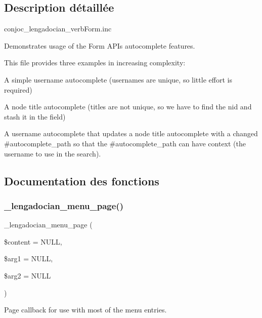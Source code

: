 \subsection{Description détaillée}
conjoc\+\_\+lengadocian\+\_\+verb\+Form.\+inc

Demonstrates usage of the Form A\+PI\textquotesingle{}s autocomplete features.

This file provides three examples in increasing complexity\+:
\begin{DoxyItemize}
\item A simple username autocomplete (usernames are unique, so little effort is required)
\item A node title autocomplete (titles are not unique, so we have to find the nid and stash it in the field)
\item A username autocomplete that updates a node title autocomplete with a changed \#autocomplete\+\_\+path so that the \#autocomplete\+\_\+path can have context (the username to use in the search). 
\end{DoxyItemize}

\subsection{Documentation des fonctions}
\hypertarget{conjoc__lengadocian__web_form_8inc_a4ffe99e612db8d794975a33aefb781f7}{}\label{conjoc__lengadocian__web_form_8inc_a4ffe99e612db8d794975a33aefb781f7} 
\subsubsection{\texorpdfstring{\+\_\+lengadocian\+\_\+menu\+\_\+page()}{\_lengadocian\_menu\_page()}}
{\footnotesize\ttfamily \+\_\+lengadocian\+\_\+menu\+\_\+page (\begin{DoxyParamCaption}\item[{}]{\$content = {\ttfamily NULL},  }\item[{}]{\$arg1 = {\ttfamily NULL},  }\item[{}]{\$arg2 = {\ttfamily NULL} }\end{DoxyParamCaption})}

Page callback for use with most of the menu entries.


